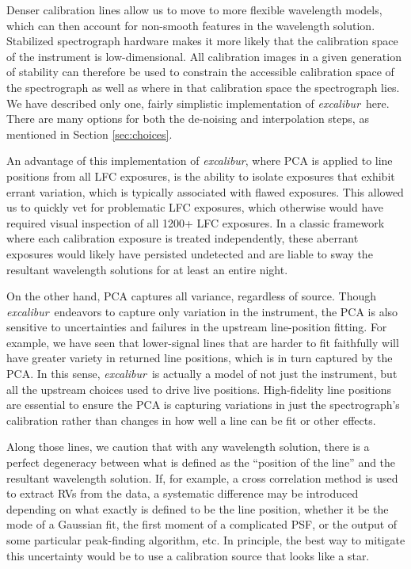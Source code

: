 \documentclass[twocolumn,table,xcolor,trackchanges]{aastex63}
\newcommand{\project}[1]{\textsl{#1}}
\newcommand{\name}{\project{excalibur}}
\begin{document}
Denser calibration lines allow us to move to more flexible wavelength models, which can then account for non-smooth features in the wavelength solution.  Stabilized spectrograph hardware makes it more likely that the calibration space of the instrument is low-dimensional.  All calibration images in a given generation of stability can therefore be used to constrain the accessible calibration space of the spectrograph as well as where in that calibration space the spectrograph lies.  We have described only one, fairly simplistic implementation of \name\ here.  There are many options for both the de-noising and interpolation steps, as mentioned in Section \ref{sec:choices}.

An advantage of this implementation of \name, where PCA is applied to line positions from all LFC exposures, is the ability to isolate exposures that exhibit errant variation, which is typically associated with flawed exposures.  This allowed us to quickly vet for problematic LFC exposures, which otherwise would have required visual inspection of all 1200+ LFC exposures.  In a classic framework where each calibration exposure is treated independently, these aberrant exposures would likely have persisted undetected and are liable to sway the resultant wavelength solutions for at least an entire night.

On the other hand, PCA captures all variance, regardless of source.  Though \name\ endeavors to capture only variation in the instrument, the PCA is also sensitive to uncertainties and failures in the upstream line-position fitting.  For example, we have seen that lower-signal lines that are harder to fit faithfully will have greater variety in returned line positions, which is in turn captured by the PCA.  In this sense, \name\ is actually a model of not just the instrument, but all the upstream choices used to drive live positions.  High-fidelity line positions are essential to ensure the PCA is capturing variations in just the spectrograph's calibration rather than changes in how well a line can be fit or other effects.

Along those lines, we caution that with any wavelength solution, there is a perfect degeneracy between what is defined as the ``position of the line'' and the resultant wavelength solution.  If, for example, a cross correlation method is used to extract RVs from the data, a systematic difference may be introduced depending on what exactly is defined to be the line position, whether it be the mode of a Gaussian fit, the first moment of a complicated PSF, or the output of some particular peak-finding algorithm, etc.  In principle, the best way to mitigate this uncertainty would be to use a calibration source that looks like a star.
\end{document}
